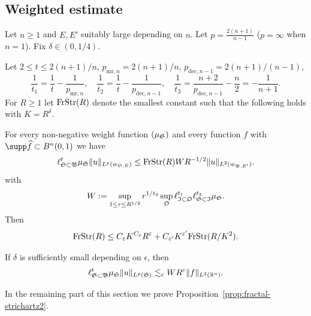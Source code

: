 \subsection{Weighted estimate}

\begin{proposition} \label{prop:fractal-strichartz2}
Let $n\geq 1$ and $E,E'$ suitably large depending on $n$.
Let $p=\frac{2(n+1)}{n-1}$ ($p=\infty$ when $n=1$).
Fix $\delta \in (0,1/4)$.

Let $2 \leq t \leq 2(n+1)/n$, $p_{\mathrm{mr},n}=2(n+1)/n$, $p_{\mathrm{dec},n-1}=2(n+1)/(n-1)$,
\[
\frac{1}{t_{1}} = \frac{1}{t} - \frac{1}{p_{\mathrm{mr},n}}, \quad
\frac{1}{t_{2}} = \frac{1}{t} - \frac{1}{p_{\mathrm{dec},n-1}}, \quad
\frac{1}{t_{3}} = \frac{n+2}{p_{\mathrm{dec},n-1}} - \frac{n}{2} = - \frac{1}{n+1}.
\]
For $R\geq 1$ let $\mathrm{FrStr}(R)$ denote the smallest constant such that the following holds with $K=R^{\delta}$.

For every non-negative weight function $(\mu_{\mathfrak{S}})$ and every function $f$ with $\supp \widehat{f}\subset B^n(0,1)$ we have
\begin{equation}\label{eq:fractal-strichartz2}
\ell^{t}_{\mathfrak{S} \subset \mathfrak{B}} \mu_{\mathfrak{S}} \lVert u \rVert_{L^{p}(w_{\mathfrak{S},E})}
\leq
\mathrm{FrStr}(R) W R^{-1/2} \lVert u \rVert_{L^{2}(w_{\mathfrak{B},E'})}.
\end{equation}
with
\[
W := \sup_{1 \leq r \leq R^{1/2}} r^{1/t_{3}} \sup_{\mathfrak{O}} \ell^{t_{1}}_{\mathfrak{I} \subset \mathfrak{O}} \ell^{t_{2}}_{\mathfrak{S} \subset \mathfrak{I}} \mu_{\mathfrak{S}}.
\]
Then
\[
\mathrm{FrStr}(R) \leq
C_{\varepsilon} K^{C_{\varepsilon}} R^{\varepsilon} + C_{\varepsilon'} K^{\varepsilon'} \mathrm{FrStr}(R/K^{2}).
\]
\end{proposition}

\begin{corollary}
\label{cor:fractal-strichartz2}
If $\delta$ is sufficiently small depending on $\epsilon$, then
\begin{equation}\label{eq:fractal-strichartz2}
\ell^{t}_{\mathfrak{S} \subset \mathfrak{B}} \mu_{\mathfrak{S}} \lVert u \rVert_{L^{p}(\mathfrak{S})}
\lesssim_{\varepsilon}
W R^{\varepsilon} \lVert f \rVert_{L^{2}(\mathbb{R}^{n})}.
\end{equation}
\end{corollary}

In the remaining part of this section we prove Proposition~\ref{prop:fractal-strichartz2}.

